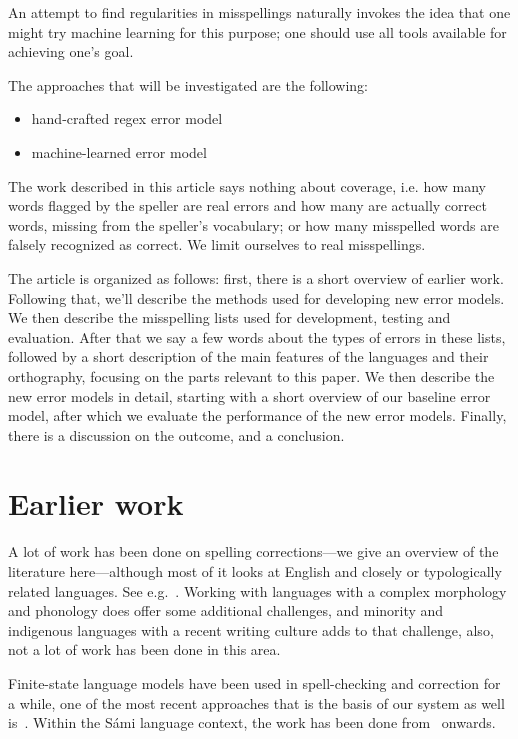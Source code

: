 \documentclass{flammie}
\begin{document}
An attempt to find regularities in misspellings naturally invokes the idea that
one might try machine learning for this purpose; one should use all tools
available for achieving one's goal.

The approaches that will be investigated are the following:

\begin{itemize}
\itemsep-0.2em
\item hand-crafted regex error model
\item machine-learned error model
\end{itemize}

The work described in this article says nothing about coverage, i.e. how many
words flagged by the speller are real errors and how many are actually correct
words, missing from the speller's vocabulary; or how many misspelled words are
falsely recognized  as correct. We limit ourselves to real misspellings.

The article is organized as follows: first, there is a short overview of earlier
work. Following that, we'll describe the methods used for developing new error
models. We then describe the misspelling lists used for development, testing and
evaluation. After that we say a few words about the types of errors in these
lists, followed by a short description of the main features of the languages and
their orthography, focusing on the parts relevant to this paper. We then
describe the new  error models in detail, starting with a short overview of our
baseline error model, after which we evaluate the performance of the new error
models. Finally, there is a discussion on the outcome, and a conclusion.

\section[Earlier work]{Earlier work}

A lot of work has been done on spelling corrections---we give an overview of the
literature here---although most of it looks at English and closely or
typologically related languages. See
e.g.~\cite{kukich1992techniques,hladek2020survey}.  Working with languages with
a complex morphology and phonology does offer some additional challenges, and
minority and indigenous languages with a recent writing culture adds to that
challenge, also, not a lot of work has been done in this area.

Finite-state language models have been used in spell-checking and correction for
a while, one of the most recent approaches that is the basis of our system as
well is~\cite{pirinen2014state}. Within the Sámi language context, the work has
been done from~\cite{gaup2005xerox} onwards.
\end{document}
